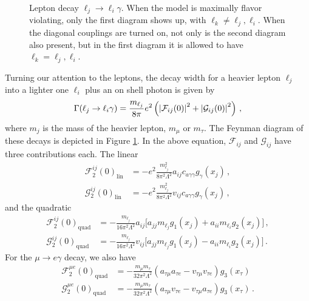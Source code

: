 \documentclass[prd,amsfonts,onecolumn,superscriptaddress,aps,nofootinbib,11pt]{revtex4-1}
\begin{document}
\begin{figure}
    \centering
    
    
    \caption{Lepton decay $\ell_j \to \ell_i \gamma$. When the model is maximally flavor violating, only the first diagram shows up, with $\ell_k \neq \ell_j, \ell_i$. When the diagonal couplings are turned on, not only is the second diagram also present, but in the first diagram it is allowed to have $\ell_k = \ell_j, \ell_i$.}
    \label{fig:lep-decay}
\end{figure}

Turning our attention to the leptons, the decay width for a heavier lepton $\ell_j$ into a lighter one $\ell_i$ plus an on shell photon is given by \cite{Cornella:2019uxs}
\begin{equation}\label{eq:lfv-decay}
    \Gamma (\ell_j \to \ell_i \gamma) = \frac{m_{\ell_j}}{8 \pi} e^2 \left( \abs{\mathcal{F}_{ij}(0)}^2 + \abs{\mathcal{G}_{ij}(0)}^2 \right) \,,
\end{equation}
where $m_j$ is the mass of the heavier lepton, $m_\mu$ or $m_\tau$. The Feynman diagram of these decays is depicted in Figure \ref{fig:lep-decay}. In the above equation, $\mathcal{F}_{ij}$ and $\mathcal{G}_{ij}$ have three contributions each. The linear
\begin{equation}
    \begin{split}
        \mathcal{F}^{ij}_2(0)_{\mathrm{lin}} &= -e^2 \frac{m_{\ell_j}^2}{8 \pi^2 \Lambda^2} a_{ij} c_{a \gamma \gamma} g_{\gamma}(x_j) \,, \\
        \mathcal{G}^{ij}_2(0)_{\mathrm{lin}} &= -e^2 \frac{m_{\ell_j}^2}{8 \pi^2 \Lambda^2} v_{ij} c_{a \gamma \gamma} g_{\gamma}(x_j) \,,
    \end{split}
\end{equation}
and the quadratic
\begin{equation}
    \begin{split}
        \mathcal{F}^{ij}_2(0)_{\mathrm{quad}} &= -\frac{m_{\ell_j}}{16 \pi^2 \Lambda^2} a_{ij} \Big[ a_{jj} m_{\ell_j} g_1(x_j) + a_{ii} m_{\ell_i} g_2(x_j)   \Big] \,, \\
        \mathcal{G}^{ij}_2(0)_{\mathrm{quad}} &= -\frac{m_{\ell_j}}{16 \pi^2 \Lambda^2} v_{ij} \Big[ a_{jj} m_{\ell_j} g_1(x_j) - a_{ii} m_{\ell_i} g_2(x_j)   \Big] \,.
    \end{split}
\end{equation}
For the $\mu \to e \gamma$ decay, we also have
\begin{equation}\label{eq:FandGemu}
    \begin{split}
        \mathcal{F}^{\mu e}_2(0)_{\text{quad}} &= -\frac{m_\mu m_\tau}{32 \pi^2 \Lambda^2} (a_{\tau \mu} a_{\tau e}  - v_{\tau \mu} v_{\tau e} ) g_3(x_\tau) \\
        \mathcal{G}^{\mu e}_2(0)_{\text{quad}} &= -\frac{m_\mu m_\tau}{32 \pi^2 \Lambda^2} (a_{\tau \mu} v_{\tau e}  - v_{\tau \mu} a_{\tau e}) g_3(x_\tau) \,.
    \end{split}
\end{equation}
\end{document}
